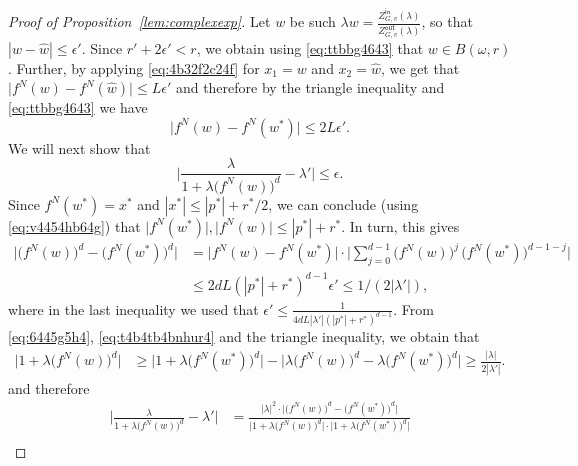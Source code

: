 \documentclass[11pt]{article}
\def\Zin{Z^{\mathsf{in}}}
\def\Zout{Z^{\mathsf{out}}}
\newcommand{\fn}[2]{#1^{#2}}
\begin{document}
\begin{proof}[Proof of Proposition~\ref{lem:complexexp}]
Let $w$ be such $\lambda w= \frac{\Zin_{G,v}(\lambda)}{\Zout_{G,v}(\lambda)}$, so that $|w-\hat{w}|\leq \epsilon'$. Since $r'+2\epsilon'<r$, we obtain using  \eqref{eq:ttbbg4643} that $w\in B(\omega,r)$. Further, by applying \eqref{eq:4b32f2c24f} for $x_1=w$ and $x_2=\hat{w}$, we get that $\big|\fn{f}{N}(w)-\fn{f}{N}(\hat{w})\big|\leq L\epsilon'$ and therefore by the triangle inequality and \eqref{eq:ttbbg4643} we have
\begin{equation}\label{eq:v4454hb64g}
\big|\fn{f}{N}(w)-\fn{f}{N}(w^*)\big|\leq 2L \epsilon'.
\end{equation}
We will next show that 
\begin{equation}\label{eq:4bhb5bb4}
\Big|\frac{\lambda}{1+\lambda \big(f^{N}(w)\big)^{d}}-\lambda'\Big|\leq \epsilon.
\end{equation}
Since $\fn{f}{N}(w^*)=x^*$ and $|x^*|\leq |p^*|+r^*/2$, we can conclude (using \eqref{eq:v4454hb64g}) that $\big|\fn{f}{N}(w^*)\big|, \big|\fn{f}{N}(w)\big|\leq |p^*|+r^*$. In turn, this gives
\begin{equation}\label{eq:t4b4tb4bnhur4}
\begin{aligned}
\big|\big(\fn{f}{N}(w)\big)^{d}-\big(\fn{f}{N}(w^*)\big)^{d}\big|&=\big|\fn{f}{N}(w)-\fn{f}{N}(w^*)\big|\cdot \Big|\sum^{d-1}_{j=0}\big(\fn{f}{N}(w)\big)^{j}\,\big(\fn{f}{N}(w^*)\big)^{d-1-j}\Big|\\
&\leq 2d L(|p^*|+r^*)^{d-1}\epsilon'\leq 1/(2|\lambda'|),
\end{aligned}
\end{equation}
where in the last inequality we used that $\epsilon'\leq \frac{1}{4d L|\lambda'|(|p^*|+r^*)^{d-1}}$. From \eqref{eq:6445g5h4}, \eqref{eq:t4b4tb4bnhur4} and the triangle inequality, we obtain that
\begin{equation}\label{eq:g5665g5nnn}
\begin{aligned}
\Big|1+\lambda \big(\fn{f}{N}(w)\big)^{d}\Big|&\geq \Big|1+\lambda \big(\fn{f}{N}(w^*)\big)^{d}\Big|-\Big|\lambda\big(\fn{f}{N}(w)\big)^{d}-\lambda\big(\fn{f}{N}(w^*)\big)^{d}\Big| 
\geq \frac{|\lambda|}{2|\lambda'|}.
\end{aligned}
\end{equation} 
and therefore
\begin{equation*}
\begin{aligned}
\Big|\frac{\lambda}{1+\lambda \big(f^{N}(w)\big)^{d}}-\lambda'\Big|&=  \frac{|\lambda|^2\cdot\big|\big(\fn{f}{N}(w)\big)^{d}-\big(\fn{f}{N}(w^*)\big)^{d}\big|}{\big|1+\lambda \big(f^{N}(w)\big)^{d}\big|\cdot \big|1+\lambda \big(f^{N}(w^*)\big)^{d}\big|}\\

\end{aligned}
\end{equation*}
\end{proof}
\end{document}
